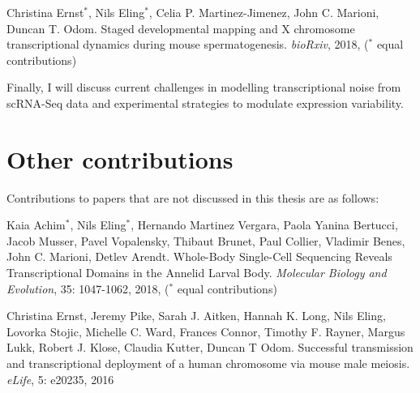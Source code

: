\begin{Abstract}
\hspace{-5mm} Christina Ernst$^\ast$, Nils Eling$^\ast$, Celia P. Martinez-Jimenez, John C. Marioni, Duncan T. Odom. Staged developmental mapping and X chromosome transcriptional dynamics during mouse spermatogenesis. \emph{bioRxiv}, 2018, ($^\ast$ equal contributions)
\end{Abstract}

Finally, I will discuss current challenges in modelling transcriptional noise from scRNA-Seq data and experimental strategies to modulate expression variability.

\newpage

\section{Other contributions}

Contributions to papers that are not discussed in this thesis are as follows:\\

\begin{Abstract}
Kaia Achim$^\ast$, Nils Eling$^\ast$, Hernando Martinez Vergara, Paola Yanina Bertucci, Jacob Musser, Pavel Vopalensky, Thibaut Brunet, Paul Collier, Vladimir Benes, John C. Marioni, Detlev Arendt. Whole-Body Single-Cell Sequencing Reveals Transcriptional Domains in the Annelid Larval Body. \emph{Molecular Biology and Evolution}, 35: 1047-1062, 2018, ($^\ast$ equal contributions)
\end{Abstract}

\begin{Abstract}
Christina Ernst, Jeremy Pike, Sarah J. Aitken, Hannah K. Long, Nils Eling, Lovorka Stojic, Michelle C. Ward, Frances Connor, Timothy F. Rayner, Margus Lukk, Robert J. Klose, Claudia Kutter, Duncan T Odom. Successful transmission and transcriptional deployment of a human chromosome via mouse male meiosis. \emph{eLife}, 5: e20235, 2016 
\end{Abstract}
